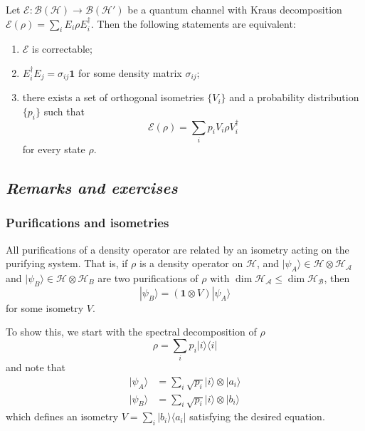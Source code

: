 \documentclass[fleqn]{article}
\newenvironment{idea}{\noindent}{\medskip}
\begin{document}
\begin{idea}

Let \(\mathcal{E}\colon\mathcal{B}(\mathcal{H})\to\mathcal{B}(\mathcal{H}')\) be a quantum channel with Kraus decomposition \(\mathcal{E}(\rho)=\sum_i E_i\rho E^\dagger_i\).
Then the following statements are equivalent:

\begin{enumerate}
\def\labelenumi{\roman{enumi}.}
\item
  \(\mathcal{E}\) is correctable;
\item
  \(E_i^\dagger E_j = \sigma_{ij}\mathbf{1}\) for some density matrix \(\sigma_{ij}\);
\item
  there exists a set of orthogonal isometries \(\{V_i\}\) and a probability distribution \(\{p_i\}\) such that
  \[
      \mathcal{E} (\rho) = \sum_i p_i V_i\rho V^\dagger_i
      \]
  for every state \(\rho\).
\end{enumerate}

\end{idea}

\hypertarget{remarks-and-exercises-quantum-channels}{%
\subsection{\texorpdfstring{\emph{Remarks and exercises}}{Remarks and exercises}}\label{remarks-and-exercises-quantum-channels}}

\hypertarget{purifications-and-isometries}{%
\subsubsection{Purifications and isometries}\label{purifications-and-isometries}}

All purifications of a density operator are related by an isometry acting on the purifying system.
That is, if \(\rho\) is a density operator on \(\mathcal{H}\), and \(|\psi_A\rangle\in \mathcal{H}\otimes\mathcal{H}_\mathcal{A}\) and \(|\psi_B\rangle\in\mathcal{H}\otimes\mathcal{H}_B\) are two purifications of \(\rho\) with \(\dim\mathcal{H}_\mathcal{A}\leqslant\dim\mathcal{H}_\mathcal{B}\), then
\[
  |\psi_B\rangle=(\mathbf{1}\otimes V)|\psi_A\rangle
\]
for some isometry \(V\).

To show this, we start with the spectral decomposition of \(\rho\)
\[
  \rho = \sum_i p_i|i\rangle\langle i|
\]
and note that
\[
  \begin{aligned}
    |\psi_A\rangle
    &= \sum_i \sqrt{p_i} |i\rangle\otimes|a_i\rangle
  \\|\psi_B\rangle
    &= \sum_i \sqrt{p_i} |i\rangle\otimes|b_i\rangle
  \end{aligned}
\]
which defines an isometry \(V=\sum_i |b_i\rangle\langle a_i|\) satisfying the desired equation.
\end{document}

